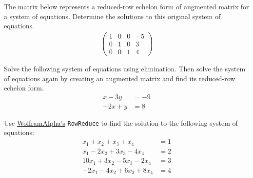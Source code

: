 \documentclass[11pt,letterpaper]{article}
\begin{document}
\newpage





 The matrix below represents a reduced-row echelon form of augmented matrix for a system of equations. Determine the solutions to this original system of equations. 
	\[
	\begin{aligned}
	\begin{pmatrix}
	1 & 0 & 0 & -5 \\
	0 & 1 & 0 & 3 \\
	0 & 0 & 1 & 4
	\end{pmatrix}
	\end{aligned}
	\]





\newpage


 Solve the following system of equations using elimination. Then solve the system of equations again by creating an augmented matrix and find its reduced-row echelon form.
	\[
	\begin{aligned}
	x - 3y&= -9 \\
	-2x + y&= 8
	\end{aligned}
	\]



\newpage


 Use \href{https://www.wolframalpha.com/}{WolframAlpha's} \texttt{RowReduce} to find the solution to the following system of equations: 
	\[
	\begin{aligned}
	x_1 + x_2 + x_3 + x_4&= 1 \\
	x_1 - 2x_2 + 3x_3 - 4x_4&= 2 \\
	10x_1 + 3x_2 - 5x_3 - 2x_4&= 3 \\
	-2x_1 - 4x_2 + 6x_3 + 8x_4&= 4
	\end{aligned}
	\]
\end{document}
